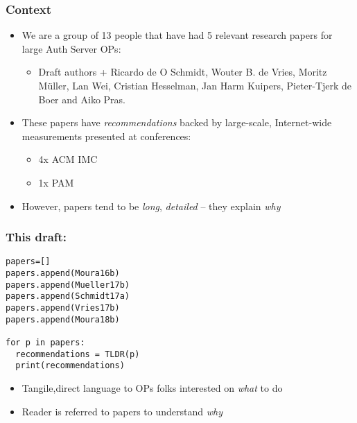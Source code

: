 \documentclass[11pt,show 
notes,notheorems,noamsthm,blank]{beamer} %
\begin{document}
\begin{frame}
 \frametitle{Context}
 
 \begin{itemize}

  \item We are a group of 13 people that have had 5 relevant research papers 
for large Auth Server OPs:
  \begin{itemize}
   \item \footnotesize Draft authors + Ricardo de O Schmidt, Wouter B. de 
Vries, Moritz M\"{u}ller, Lan Wei,  Cristian Hesselman, Jan Harm Kuipers, 
Pieter-Tjerk de Boer and Aiko  Pras.
  \end{itemize}

 \item These papers have \textit{recommendations} backed by 
large-scale, Internet-wide measurements presented at conferences:
\begin{itemize}
 \item 4x ACM IMC
 \item 1x PAM
\end{itemize}


\item However, papers tend to be \textit{long}, \textit{detailed} -- they 
explain \textit{why} 

 \end{itemize}

\end{frame}



\begin{frame}[fragile]
 \frametitle{\textbf{This draft:}}
 
 

 \lstset{language=Python}
 \lstset{frame=lines}
  \lstset{basicstyle=\footnotesize}
  
  
\begin{lstlisting}
papers=[]
papers.append(Moura16b)
papers.append(Mueller17b)
papers.append(Schmidt17a)
papers.append(Vries17b)
papers.append(Moura18b)

for p in papers:
  recommendations = TLDR(p)
  print(recommendations)
\end{lstlisting}

\begin{itemize}
 \item Tangile,direct language to OPs folks interested on \textit{what} to do
 \item Reader is referred to papers to understand \textit{why}
\end{itemize}


\end{frame}
\end{document}
